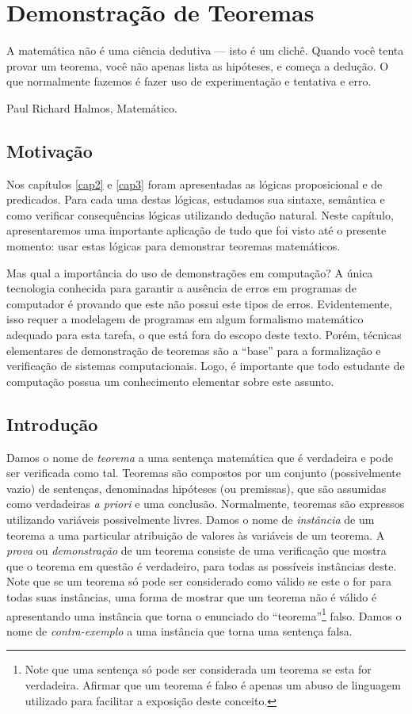 \chapter{Demonstração de Teoremas}\label{cap4}

\epigraph{A matemática não é uma ciência dedutiva --- isto é um
  clichê. Quando você tenta provar um teorema, você não apenas lista
  as hipóteses, e começa a dedução. O que normalmente fazemos é fazer
  uso de experimentação e tentativa e erro.}{Paul Richard Halmos,
  Matemático.}

\section{Motivação}

Nos capítulos \ref{cap2} e \ref{cap3} foram apresentadas as lógicas
proposicional e de predicados. Para cada uma destas lógicas, estudamos
sua sintaxe, semântica e como verificar consequências lógicas
utilizando dedução natural. Neste capítulo, apresentaremos uma
importante aplicação de tudo que foi visto até o presente momento:
usar estas lógicas para demonstrar teoremas matemáticos.

Mas qual a importância do uso de demonstrações em computação? A única
tecnologia conhecida para garantir a ausência de erros em programas de
computador é provando que este não possui este tipos de
erros. Evidentemente, isso requer a modelagem de programas em algum
formalismo matemático adequado para esta tarefa, o que está fora do
escopo deste texto. Porém, técnicas elementares de demonstração de
teoremas são a ``base'' para a formalização e verificação de sistemas
computacionais. Logo, é importante que todo estudante de computação
possua um conhecimento elementar sobre este assunto.

\section{Introdução}

Damos o nome de \emph{teorema} a uma sentença matemática que é
verdadeira e pode ser verificada como tal. Teoremas são compostos por
um conjunto (possivelmente vazio) de sentenças, denominadas hipóteses
(ou premissas), que são assumidas como verdadeiras \emph{a priori} e
uma conclusão.
 Normalmente, teoremas
são expressos utilizando variáveis possivelmente livres. Damos o nome
de \emph{instância} de um teorema a uma particular atribuição de
valores às variáveis de um teorema.  A \emph{prova} ou
\emph{demonstração} de um teorema consiste de uma verificação que
mostra que o teorema em questão é verdadeiro, para todas as possíveis
instâncias deste. Note que se um teorema só pode ser considerado como
válido se este o for para todas suas instâncias, uma forma de mostrar
que um teorema não é válido é apresentando uma instância que torna o
enunciado do ``teorema''\footnote{Note que uma sentença só pode ser
  considerada um teorema se esta for verdadeira. Afirmar que um
  teorema é falso é apenas um abuso de linguagem utilizado para
  facilitar a exposição deste conceito.} falso. Damos o nome de \emph{contra-exemplo} a
uma instância que torna uma sentença falsa.


